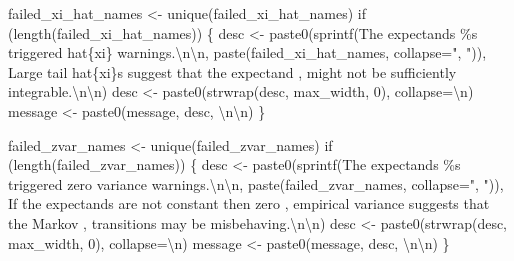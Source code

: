 \documentclass[
  letterpaper,
  DIV=11,
  numbers=noendperiod]{scrartcl}
\newenvironment{Shaded}{\begin{snugshade}}{\end{snugshade}}
\newcommand{\AttributeTok}[1]{\textcolor[rgb]{0.40,0.45,0.13}{#1}}
\newcommand{\ControlFlowTok}[1]{\textcolor[rgb]{0.00,0.23,0.31}{#1}}
\newcommand{\DecValTok}[1]{\textcolor[rgb]{0.68,0.00,0.00}{#1}}
\newcommand{\FunctionTok}[1]{\textcolor[rgb]{0.28,0.35,0.67}{#1}}
\newcommand{\NormalTok}[1]{\textcolor[rgb]{0.00,0.23,0.31}{#1}}
\newcommand{\OtherTok}[1]{\textcolor[rgb]{0.00,0.23,0.31}{#1}}
\newcommand{\SpecialCharTok}[1]{\textcolor[rgb]{0.37,0.37,0.37}{#1}}
\newcommand{\StringTok}[1]{\textcolor[rgb]{0.13,0.47,0.30}{#1}}
\begin{document}
\begin{Shaded}
\begin{Highlighting}[]
\NormalTok{  failed\_xi\_hat\_names }\OtherTok{\textless{}{-}} \FunctionTok{unique}\NormalTok{(failed\_xi\_hat\_names)}
  \ControlFlowTok{if}\NormalTok{ (}\FunctionTok{length}\NormalTok{(failed\_xi\_hat\_names)) \{}
\NormalTok{    desc }\OtherTok{\textless{}{-}} 
      \FunctionTok{paste0}\NormalTok{(}\FunctionTok{sprintf}\NormalTok{(}\StringTok{\textquotesingle{}The expectands \%s triggered hat\{xi\} warnings.}\SpecialCharTok{\textbackslash{}n\textbackslash{}n}\StringTok{\textquotesingle{}}\NormalTok{,}
             \FunctionTok{paste}\NormalTok{(failed\_xi\_hat\_names, }\AttributeTok{collapse=}\StringTok{", "}\NormalTok{)),}
             \StringTok{\textquotesingle{}  Large tail hat\{xi\}s suggest that the expectand \textquotesingle{}}\NormalTok{,}
             \StringTok{\textquotesingle{}might not be sufficiently integrable.}\SpecialCharTok{\textbackslash{}n\textbackslash{}n}\StringTok{\textquotesingle{}}\NormalTok{)}
\NormalTok{    desc }\OtherTok{\textless{}{-}} \FunctionTok{paste0}\NormalTok{(}\FunctionTok{strwrap}\NormalTok{(desc, max\_width, }\DecValTok{0}\NormalTok{), }\AttributeTok{collapse=}\StringTok{\textquotesingle{}}\SpecialCharTok{\textbackslash{}n}\StringTok{\textquotesingle{}}\NormalTok{)}
\NormalTok{    message }\OtherTok{\textless{}{-}} \FunctionTok{paste0}\NormalTok{(message, desc, }\StringTok{\textquotesingle{}}\SpecialCharTok{\textbackslash{}n\textbackslash{}n}\StringTok{\textquotesingle{}}\NormalTok{)}
\NormalTok{  \}}
        
\NormalTok{  failed\_zvar\_names }\OtherTok{\textless{}{-}} \FunctionTok{unique}\NormalTok{(failed\_zvar\_names)}
  \ControlFlowTok{if}\NormalTok{ (}\FunctionTok{length}\NormalTok{(failed\_zvar\_names)) \{ }
\NormalTok{    desc }\OtherTok{\textless{}{-}} 
      \FunctionTok{paste0}\NormalTok{(}\FunctionTok{sprintf}\NormalTok{(}\StringTok{\textquotesingle{}The expectands \%s triggered zero variance warnings.}\SpecialCharTok{\textbackslash{}n\textbackslash{}n}\StringTok{\textquotesingle{}}\NormalTok{,}
             \FunctionTok{paste}\NormalTok{(failed\_zvar\_names, }\AttributeTok{collapse=}\StringTok{", "}\NormalTok{)),}
             \StringTok{\textquotesingle{}  If the expectands are not constant then zero \textquotesingle{}}\NormalTok{,}
             \StringTok{\textquotesingle{}empirical variance suggests that the Markov \textquotesingle{}}\NormalTok{,}
             \StringTok{\textquotesingle{}transitions may be misbehaving.}\SpecialCharTok{\textbackslash{}n\textbackslash{}n}\StringTok{\textquotesingle{}}\NormalTok{)}
\NormalTok{    desc }\OtherTok{\textless{}{-}} \FunctionTok{paste0}\NormalTok{(}\FunctionTok{strwrap}\NormalTok{(desc, max\_width, }\DecValTok{0}\NormalTok{), }\AttributeTok{collapse=}\StringTok{\textquotesingle{}}\SpecialCharTok{\textbackslash{}n}\StringTok{\textquotesingle{}}\NormalTok{)}
\NormalTok{    message }\OtherTok{\textless{}{-}} \FunctionTok{paste0}\NormalTok{(message, desc, }\StringTok{\textquotesingle{}}\SpecialCharTok{\textbackslash{}n\textbackslash{}n}\StringTok{\textquotesingle{}}\NormalTok{)}
\NormalTok{  \}}
  

\end{Highlighting}
\end{Shaded}
\end{document}
